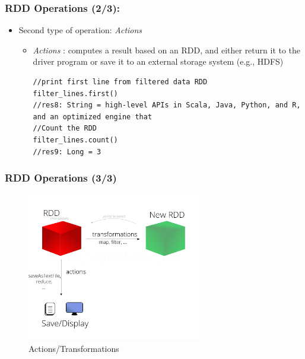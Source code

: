 %
%
%

\begin{frame}[fragile]
	\frametitle{RDD Operations (2/3):}
	\begin{itemize}[<+->]
		\item Second type of operation: \textit{Actions}
		\begin{itemize}

			\item \textit{Actions} : computes a result based on an RDD, and either return it to the driver program or save it to an external storage system (e.g., HDFS)
			\begin{lstlisting}[style=myScalastyle, caption=RDD Actions Example 1]
//print first line from filtered data RDD
filter_lines.first()
//res8: String = high-level APIs in Scala, Java, Python, and R, and an optimized engine that			
//Count the RDD
filter_lines.count()
//res9: Long = 3			
			\end{lstlisting}
		\end{itemize}
	\end{itemize}
\end{frame}



\begin{frame}
	\frametitle{RDD Operations (3/3)}
		\begin{figure}
			\caption{Actions/Transformations}  		  	
			\includegraphics[width=\textwidth,height=6.5cm]{Graphics/Actions_Transformations.png}
		\end{figure}
\end{frame}


%
%
%

